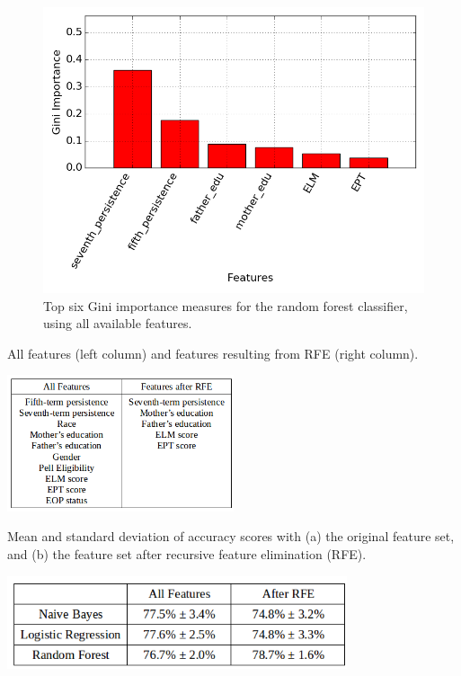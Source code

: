 \begin{figure}[htbp]
\centering
\includegraphics[width=\textwidth]{figures/featureimportances_all.png}
\caption{Top six Gini importance measures for the random forest classifier, using all available features.}
\label{featureimportances_all}
\end{figure}

\begin{table}[htbp]
\centering
\caption{All features (left column) and features resulting from RFE (right column).}
\includegraphics[width=0.5\textwidth]{tables/feature_sets.png}
\label{feature_sets}
\end{table}

\begin{table}[htbp]
\centering
\caption{Mean and standard deviation of accuracy scores with (a) the original feature set, and (b) the feature set after recursive feature elimination (RFE).}
\includegraphics[width=0.75\textwidth]{tables/table_accuracies.png}
\label{table_accuracies}
\end{table}

